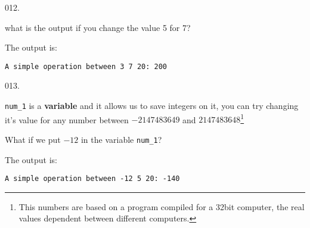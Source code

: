 \documentclass[]{book}
\begin{document}
\vspace{2mm}\noindent\hrulefill{}

\begin{minipage}{\linewidth}\noindent
{\tiny 012.}\\
\begin{minipage}[t]{.485\linewidth}

what is the output if you change the value 5 for 7?

\end{minipage}
\hfill
\begin{minipage}[t]{.485\linewidth}

The output is:

\begin{framed}

\begin{verbatim}
A simple operation between 3 7 20: 200
\end{verbatim}

\end{framed}

\end{minipage}
\end{minipage}

\vspace{2mm}\noindent\hrulefill{}

\begin{minipage}{\linewidth}\noindent
{\tiny 013.}\\
\begin{minipage}[t]{.485\linewidth}

\texttt{num\_1} is a \textbf{variable} and it allows us to save integers
on it, you can try changing it's value for any number between
\(-2147483649\) and \(2147483648\)\footnote{This numbers are based on a
  program compiled for a 32bit computer, the real values dependent
  between different computers.}

What if we put \(-12\) in the variable \texttt{num\_1}?

\end{minipage}
\hfill
\begin{minipage}[t]{.485\linewidth}

The output is:

\begin{framed}

\begin{verbatim}
A simple operation between -12 5 20: -140
\end{verbatim}

\end{framed}

\end{minipage}
\end{minipage}
\end{document}
